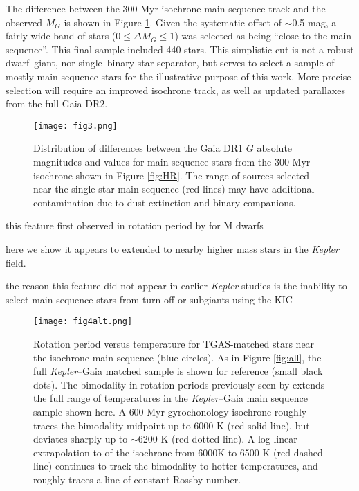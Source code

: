 \documentclass[manuscript, letterpaper]{aastex6}
\makeatletter
\let\origsection\section
\renewcommand\section{\@ifstar{\starsection}{\nostarsection}}
\newcommand\nostarsection[1]{\sectionprelude\origsection{#1}}
\newcommand\starsection[1]{\sectionprelude\origsection*{#1}}
\newcommand\sectionprelude{\vspace{1em}}
\newcommand{\Kepler}{\textsl{Kepler}\xspace}
\makeatother
\begin{document}
The difference between the 300 Myr isochrone main sequence track and the observed $M_G$ is shown in Figure \ref{fig:hist}. Given the systematic offset of $\sim$0.5 mag, a fairly wide band of stars ($0\le \Delta M_G \le 1$) was selected as being ``close to the main sequence''. This final sample included 440 stars. This simplistic cut is not a robust dwarf--giant, nor single--binary star separator, but serves to select a sample of mostly main sequence stars for the illustrative purpose of this work. More precise selection will require an improved isochrone track, as well as updated parallaxes from the full Gaia DR2.




\begin{figure}[]
\centering
\texttt{[image: fig3.png]}
\caption{Distribution of differences between the Gaia DR1 $G$ absolute magnitudes and values for main sequence stars from the 300 Myr isochrone shown in Figure \ref{fig:HR}. The range of sources selected near the single star main sequence (red lines) may have additional contamination due to dust extinction and binary companions.}
\label{fig:hist}
\end{figure}




\section{Extending the Spin-Down Gap}

this feature first observed in rotation period by \citet{mcquillan2013} for M dwarfs

here we show it appears to extended to nearby higher mass stars in the \Kepler field.

the reason this feature did not appear in earlier \Kepler studies is the inability to select main sequence stars from turn-off or subgiants using the KIC


\begin{figure}[]
\centering
\texttt{[image: fig4alt.png]}
\caption{ Rotation period versus temperature for TGAS-matched stars near the isochrone main sequence (blue circles). 
As in Figure \ref{fig:all}, the full \Kepler--Gaia matched sample is shown for reference (small black dots). The bimodality in rotation periods previously seen by \citet{mcquillan2014} extends the full range of temperatures in the \Kepler--Gaia main sequence sample shown here.
A \citet{meibom2011} 600 Myr gyrochonology-isochrone roughly traces the bimodality midpoint up to 6000 K (red solid line), but deviates sharply up to $\sim$6200 K (red dotted line). A log-linear extrapolation to of the isochrone from 6000K to 6500 K (red dashed line) continues to track the bimodality to hotter temperatures, and roughly traces a line of constant Rossby number. 
}
\label{fig:gyro}
\end{figure}
\end{document}
